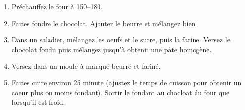 
\begin{ingredients}
\end{ingredients}


\begin{recipe}
  \begin{enumerate}
  \item Pr\'echauffez le four \`a 150--180\degreeC.

  \item Faites fondre le chocolat.  Ajouter le beurre et m\'elangez bien.

  \item Dans un saladier, m\'elangez les oeufs et le sucre, puis la
    farine. Versez le chocolat fondu puis m\'elangez jusqu'\`a
    obtenir une p\`ate homog\`ene.
    
  \item Versez dans un moule \`a manqu\'e beurr\'e et farin\'e.

  \item Faites cuire environ 25 minute (ajustez le temps de cuisson
    pour obtenir un coeur plus ou moins fondant).  Sortir le fondant
    au chocloat du four que lorsqu'il est froid.

  \end{enumerate}

\end{recipe}
